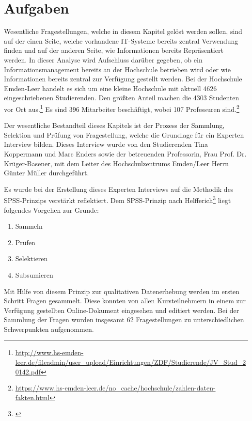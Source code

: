 \section{Aufgaben}
Wesentliche Fragestellungen, welche in diesem Kapitel gelöst werden sollen, sind auf der einen Seite, welche vorhandene IT-Systeme bereits zentral Verwendung finden und auf der anderen Seite, wie Informationen bereits Repräsentiert werden. In dieser Analyse wird Aufschluss darüber gegeben, ob ein Informationsmanagement bereits an der Hochschule betrieben wird oder wie Informationen bereits zentral zur Verfügung gestellt werden. 
Bei der Hochschule Emden-Leer handelt es sich um eine kleine Hochschule mit aktuell 4626 eingeschriebenen Studierenden. Den größten Anteil machen die 4303 Studenten vor Ort aus.\footnote{\url{http://www.hs-emden-leer.de/fileadmin/user_upload/Einrichtungen/ZDF/Studierende/JV_Stud_20142.pdf}} Es sind 396 Mitarbeiter beschäftigt, wobei 107 Professuren sind.\footnote{\url{https://www.hs-emden-leer.de/no_cache/hochschule/zahlen-daten-fakten.html}}

Der wesentliche Bestandteil dieses Kapitels ist der Prozess der Sammlung, Selektion und Prüfung von Fragestellung, welche die Grundlage für ein Experten Interview bilden. Dieses Interview wurde von den Studierenden Tina Koppermann und Marc Enders sowie der betreuenden Professorin, Frau Prof. Dr. Krüger-Basener, mit dem Leiter des Hochschulzentrums Emden/Leer Herrn Günter Müller durchgeführt. 

Es wurde bei der Erstellung dieses Experten Interviews auf die Methodik des SPSS-Prinzips verstärkt reflektiert. Dem SPSS-Prinzip nach Helfferich\footnote{\cite{helferich_2009}} liegt folgendes Vorgehen zur Grunde:
\begin{enumerate}
	\item Sammeln
	\item Prüfen
	\item Selektieren
	\item Subsumieren		
\end{enumerate}
Mit Hilfe von diesem Prinzip zur qualitativen Datenerhebung werden im ersten Schritt Fragen gesammelt. Diese konnten von allen Kursteilnehmern in einem zur Verfügung gestellten Online-Dokument eingesehen und editiert werden. Bei der Sammlung der Fragen wurden insgesamt 62 Fragestellungen zu unterschiedlichen Schwerpunkten aufgenommen.

